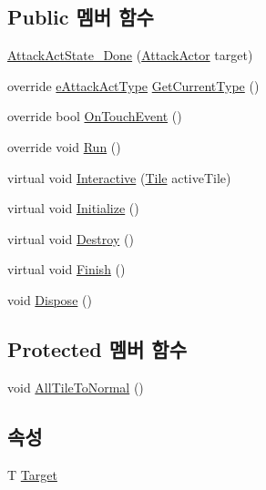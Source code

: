 \subsection*{Public 멤버 함수}
\begin{DoxyCompactItemize}
\item 
\hyperlink{class_attack_actor_1_1_attack_act_state___done_a57cc20f4a46c32a80eed29122c71c2e0}{Attack\+Act\+State\+\_\+\+Done} (\hyperlink{class_attack_actor}{Attack\+Actor} target)
\item 
override \hyperlink{_attack_actor_8cs_a10659ce944335df4ded984f6bc41f31b}{e\+Attack\+Act\+Type} \hyperlink{class_attack_actor_1_1_attack_act_state___done_aa72d89d74242db3347ae95f317a6268e}{Get\+Current\+Type} ()
\item 
override bool \hyperlink{class_attack_actor_1_1_attack_act_state___done_ae982c0e989161fdb1481d799c4e48369}{On\+Touch\+Event} ()
\item 
override void \hyperlink{class_attack_actor_1_1_attack_act_state___done_a87dc9fe06b7132e7eff68fce885c2cd2}{Run} ()
\item 
virtual void \hyperlink{class_attack_actor_1_1_attack_act_state_a2ae9dd2f7ec8db76d25d7ad7ed58b89d}{Interactive} (\hyperlink{class_tile}{Tile} active\+Tile)
\item 
virtual void \hyperlink{class_m_c_n_1_1_state_a8eabaffe047e6dccd5c5d8aed7bf218a}{Initialize} ()
\item 
virtual void \hyperlink{class_m_c_n_1_1_state_a32af22a6a0a979d3b3a80225426aa839}{Destroy} ()
\item 
virtual void \hyperlink{class_m_c_n_1_1_state_a6de4f94b23916fcd05f589759da9ac3f}{Finish} ()
\item 
void \hyperlink{class_m_c_n_1_1_state_a6c53b2eda47e718ff469fd76a95cf02a}{Dispose} ()
\end{DoxyCompactItemize}
\subsection*{Protected 멤버 함수}
\begin{DoxyCompactItemize}
\item 
void \hyperlink{class_attack_actor_1_1_attack_act_state_a993762ec959af926e416f03fa7b71203}{All\+Tile\+To\+Normal} ()
\end{DoxyCompactItemize}
\subsection*{속성}
\begin{DoxyCompactItemize}
\item 
T \hyperlink{class_m_c_n_1_1_state_a93ba2fd920292031bd6e65b1dc505cb3}{Target}
\end{DoxyCompactItemize}


